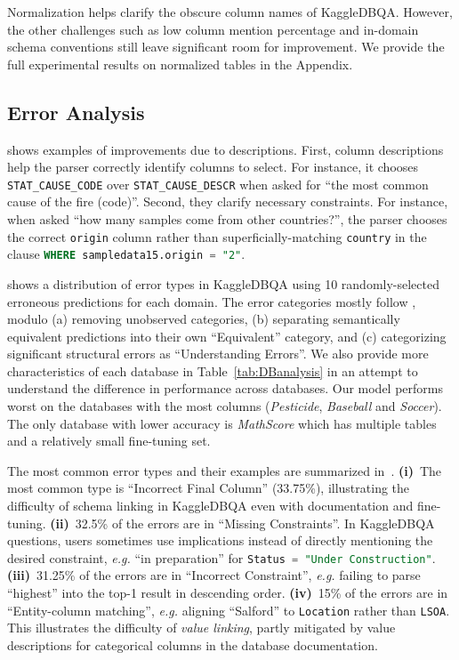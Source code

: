 \documentclass[11pt,a4paper]{article}
\newcommand{\systemname}{\mbox{KaggleDBQA}\xspace}
\newcommand{\eg}{\textit{e.g.}\xspace}
\newcommand{\sql}[1]{\lstinline[language=SQL, basicstyle=\footnotesize\ttfamily]{#1}}
\begin{document}
Normalization helps clarify the obscure column names of \systemname. However, the other challenges such as low column mention percentage and in-domain schema conventions still leave significant room for improvement. We provide the full experimental results on normalized tables in the Appendix.





\subsection{Error Analysis}


 shows examples of improvements due to descriptions.
First, column descriptions help the parser correctly identify columns to select.
For instance, it chooses \sql{STAT_CAUSE_CODE} over \sql{STAT_CAUSE_DESCR} when asked for ``the most common cause of the
fire (code)''.
Second, they clarify necessary constraints.
For instance, when asked ``how many samples come from other countries?'', the parser chooses the correct \sql{origin}
column rather than superficially-matching \sql{country} in the clause
\sql{WHERE sampledata15.origin = "2"}.

 shows a distribution of error types in \systemname using 10 randomly-selected erroneous
predictions for each domain.
The error categories mostly follow \citet{suhr2020exploring}, modulo (a) removing unobserved categories, (b) separating
semantically equivalent predictions into their own ``Equivalent'' category, and (c) categorizing significant structural
errors as ``Understanding Errors''. We also provide more characteristics of each database in Table~\ref{tab:DBanalysis} in an attempt to understand the difference in performance across databases. Our model performs worst on the databases with the most columns (\textit{Pesticide}, \textit{Baseball} and \textit{Soccer}). The only database with lower accuracy is \textit{MathScore} which has multiple tables and a relatively small fine-tuning set.






The most common error types and their examples are summarized in~.
\textbf{(i)}~The most common type is ``Incorrect Final Column'' (33.75\%),
illustrating the difficulty of schema linking in \systemname even with documentation and fine-tuning.
\textbf{(ii)}~32.5\% of the errors are in ``Missing Constraints''.
In \systemname questions, users sometimes use implications instead of directly mentioning the desired constraint, \eg
``in preparation'' for \sql{Status = "Under Construction"}.
\textbf{(iii)}~31.25\% of the errors are in ``Incorrect Constraint'', \eg failing to parse ``highest'' into the
top-1 result in descending order.
\textbf{(iv)}~15\% of the errors are in ``Entity-column matching'', \eg aligning ``Salford'' to \sql{Location}
rather than \sql{LSOA}.
This illustrates the difficulty of \textit{value linking}, partly mitigated by value descriptions for categorical
columns in the database documentation.
\end{document}
